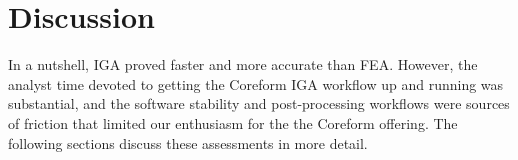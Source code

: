\documentclass[12pt,report,justified]{SANDreport}
\begin{document}
% 

\chapter{Discussion}

In a nutshell, IGA proved faster and more accurate than FEA.  However, the analyst
time devoted to getting the Coreform IGA workflow up and running was substantial, and the software stability and post-processing workflows were sources of friction that limited
our enthusiasm for the the Coreform offering.  The following sections discuss these assessments in more detail.
\end{document}
